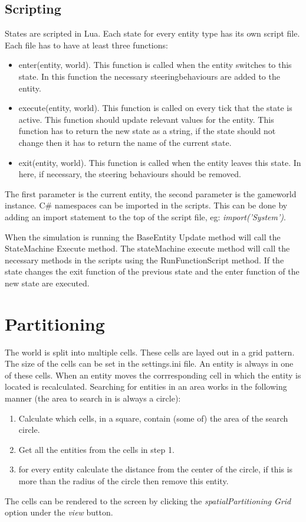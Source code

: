 \documentclass[10pt]{extarticle} %
\begin{document}
   \subsection {Scripting}
   States are scripted in Lua. Each state for every entity type has its own script file. Each file has to have at least three functions: 
   \begin{itemize}
   \item enter(entity, world). This function is called when the entity switches to this state. In this function the necessary steeringbehaviours are added to the entity.
   \item execute(entity, world). This function is called on every tick that the state is active. This function should update relevant values for the entity. This function has to return the new state as a string, if the state should not change then it has to return the name of the current state.
   \item exit(entity, world). This function is called when the entity leaves this state. In here, if necessary, the steering behaviours should be removed.
   \end{itemize}
   The first parameter is the current entity, the second parameter is the gameworld instance. C\# namespaces can be imported in the scripts. This can be done by adding an import statement to the top of the script file, eg: \emph{import('System')}.
   
   When the simulation is running the BaseEntity Update method will call the StateMachine Execute method. The stateMachine execute method will call the necessary methods in the scripts using the RunFunctionScript method. If the state changes the exit function of the previous state and the enter function of the new state are executed.
   
   \newpage
   \section {Partitioning}
   The world is split into multiple cells. These cells are layed out in a grid pattern. The size of the cells can be set in the settings.ini file. An entity is always in one of these cells. When an entity moves the corrresponding cell in which the entity is located is recalculated. Searching for entities in an area works in the following manner (the area to search in is always a circle):
   \begin{enumerate}
   \item Calculate which cells, in a square, contain (some of) the area of the search circle.
   \item Get all the entities from the cells in step 1.
   \item for every entity calculate the distance from the center of the circle, if this is more than the radius of the circle then remove this entity.
   \end{enumerate}
   The cells can be rendered to the screen by clicking the \emph{spatialPartitioning Grid} option under the \emph{view} button. 
   
\end{document}
